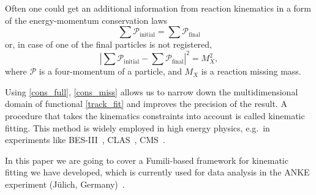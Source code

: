 Often one could get an additional information from reaction kinematics in a form of the energy-momentum conservation laws
\begin{equation}
\label{cons_full}
\sum\mathcal{P}_\mathrm{initial} = \sum\mathcal{P}_\mathrm{final}
\end{equation}
or, in case of one of the final particles is not registered,
\begin{equation}
\label{cons_miss}
\displaystyle\left|\sum\mathcal{P}_\mathrm{initial} - \sum\mathcal{P}_\mathrm{final}\right|^2 = M_X^2,
\end{equation}
where $\mathcal{P}$ is a four-momentum of a particle, and $M_X$ is a reaction missing mass.

Using \eqref{cons_full}, \eqref{cons_miss} allows us to narrow down the multidimensional domain of functional \eqref{track_fit} 
and improves the precision of the result.
A procedure that takes the kinematics constraints into account is called kinematic fitting.
This method is widely employed in high energy physics, e.g.\ in experiments like 
BES-III~\cite{BESIII}, %
CLAS~\cite{CLAS}, %
CMS~\cite{CMS}. %

In this paper we are going to cover a Fumili-based framework for kinematic fitting we have developed, which is currently used for data analysis in the ANKE experiment (Jülich, Germany)~\cite{anke}.
